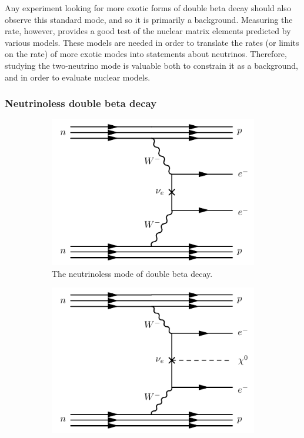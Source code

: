 \documentclass[herrin-thesis.tex]{subfiles}
\begin{document}
Any experiment looking for more exotic forms of double beta decay should also observe this standard mode, and so it is primarily a background. Measuring the rate, however, provides a good test of the nuclear matrix elements predicted by various models. These models are needed in order to translate the rates (or limits on the rate) of more exotic modes into statements about neutrinos. Therefore, studying the two-neutrino mode is valuable both to constrain it as a background, and in order to evaluate nuclear models.

\subsubsection{Neutrinoless double beta decay}

\begin{figure}[tbp]
         \begin{subfigure}[b]{0.48\textwidth}
		\centering
		\includegraphics[width=\textwidth]{./feynman_diagrams/zeronubetabeta.pdf}
		\caption[Diagram of \(0\nu\beta\beta\)]{The neutrinoless mode of double beta decay.}
		\label{fig:nu_diagram_0nubb}
	\end{subfigure}\hfill%
         \begin{subfigure}[b]{0.48\textwidth}
		\centering
		\includegraphics[width=\textwidth]{./feynman_diagrams/zeronubetabetamajoron.pdf}

\end{subfigure}
\end{figure}
\end{document}
